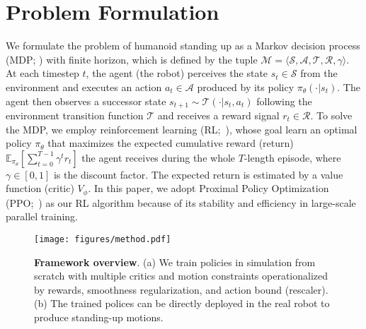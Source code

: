 \section{Problem Formulation}
We formulate the problem of humanoid standing up as a Markov decision process (MDP; \cite{puterman2014markov}) with finite horizon, which is defined by the tuple $\mathcal{M} = \langle \mathcal{S}, \mathcal{A}, \mathcal{T}, \mathcal{R}, \gamma \rangle$.  
At each timestep $t$, the agent (\ie the robot) perceives the state $s_t\in\mathcal{S}$ from the environment and executes an action $a_t\in\mathcal{A}$ produced by its policy $\pi_\theta(\cdot|s_t)$. The agent then observes a successor state $s_{t+1}\sim \mathcal{T}(\cdot|s_t, a_t)$ following the environment transition function $\mathcal{T}$ and receives a reward signal $r_t\in\mathcal{R}$. To solve the MDP, we employ reinforcement learning (RL;~\cite{sutton2018reinforcement}), whose goal learn an optimal policy $\pi_\theta$ that maximizes the expected cumulative reward (return) $\mathbb{E}_{\pi_\theta}[\sum_{t=0}^{T-1}\gamma^t r_t]$ the agent receives during the whole $T$-length episode, where $\gamma\in[0, 1]$ is the discount factor. The expected return is estimated by a value function (critic) $V_\phi$. In this paper, we adopt Proximal Policy Optimization (PPO;~\cite{schulman2017proximal}) as our RL algorithm because of its stability and efficiency in large-scale parallel training. 


\begin{figure}[t]
    \centering
    \texttt{[image: figures/method.pdf]}
    \caption{\textbf{Framework overview}. (a) We train policies in simulation from scratch with multiple critics and motion constraints operationalized by rewards, smoothness regularization, and action bound (rescaler). (b) The trained polices can be directly deployed in the real robot to produce standing-up motions.}
    \label{fig:framework}
    \vspace{-0.05in}
\end{figure}

